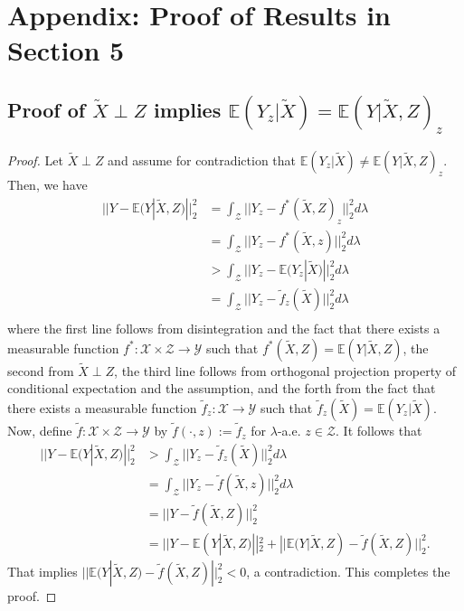 \documentclass[twoside,11pt]{article}
\begin{document}

\section{Appendix: Proof of Results in Section 5} \label{A:Section 5 Appendix}

\subsection{Proof of $\tilde{X} \perp Z$ implies $\mathbb{E}(Y_z|\tilde{X}) = \mathbb{E}(Y|\tilde{X},Z)_z$}

\begin{proof}
Let $\tilde{X} \perp Z$ and assume for contradiction that $\mathbb{E}(Y_z|\tilde{X}) \neq \mathbb{E}(Y|\tilde{X},Z)_z$. Then, we have
\begin{align*}
||Y - \mathbb{E}(Y|\tilde{X},Z)||_2^2
& = \int_{\mathcal{Z}} ||Y_z - f^*(\tilde{X},Z)_z||_2^2 d\lambda\\
& = \int_{\mathcal{Z}} ||Y_z - f^*(\tilde{X},z)||_2^2 d\lambda\\
& > \int_{\mathcal{Z}} ||Y_z - \mathbb{E}(Y_z|\tilde{X})||_2^2 d\lambda\\
& = \int_{\mathcal{Z}} ||Y_z - \tilde{f}_z(\tilde{X})||_2^2 d\lambda\\
\end{align*}
where the first line follows from disintegration and the fact that there exists a measurable function $f^*: \mathcal{X} \times \mathcal{Z} \rightarrow \mathcal{Y}$ such that $f^*(\tilde{X},Z) = \mathbb{E}(Y|\tilde{X},Z)$, the second from $\tilde{X} \perp Z$, the third line follows from orthogonal projection property of conditional expectation and the assumption, and the forth from the fact that there exists a measurable function $\tilde{f}_z: \mathcal{X}  \rightarrow \mathcal{Y}$ such that $\tilde{f}_z(\tilde{X}) = \mathbb{E}(Y_z|\tilde{X})$.
Now, define $\tilde{f}: \mathcal{X} \times \mathcal{Z} \rightarrow \mathcal{Y}$ by $\tilde{f}(\cdot,z) := \tilde{f}_z$ for $\lambda$-a.e. $z \in \mathcal{Z}$. It follows that
\begin{align*}
||Y - \mathbb{E}(Y|\tilde{X},Z)||_2^2
& > \int_{\mathcal{Z}} ||Y_z - \tilde{f}_z(\tilde{X})||_2^2 d\lambda\\
& = \int_{\mathcal{Z}} ||Y_z - \tilde{f}(\tilde{X},z)||_2^2 d\lambda\\
& = ||Y - \tilde{f}(\tilde{X},Z)||_2^2\\
& = ||Y - \mathbb{E}(Y|\tilde{X},Z)||_2^2 + ||\mathbb{E}(Y|\tilde{X},Z) - \tilde{f}(\tilde{X},Z)||_2^2.
\end{align*}
That implies $ ||\mathbb{E}(Y|\tilde{X},Z) - \tilde{f}(\tilde{X},Z)||_2^2 < 0$, a contradiction. This completes the proof.
\end{proof}
\end{document}
